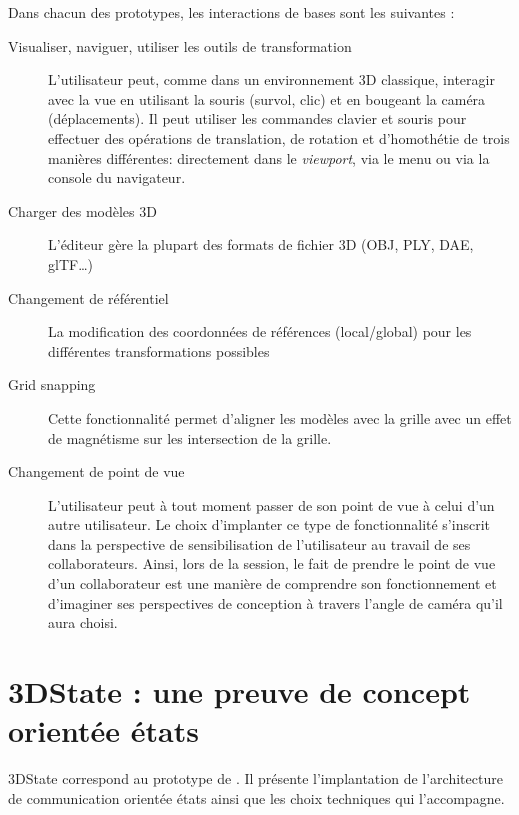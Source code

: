Dans chacun des prototypes, les interactions de bases sont les suivantes :
\begin{description}
	
	\item[Visualiser, naviguer, utiliser les outils de transformation] L'utilisateur peut, 
	com\-me dans un environnement \gls{3D} classique, interagir avec la vue en 
	utilisant 
	la souris (survol, clic) et en bougeant la caméra (déplacements). Il peut 
	utiliser les commandes clavier et souris pour effectuer des opérations de 
	translation, de rotation et d'homothétie de trois manières différentes: 
	directement dans le \textit{viewport}, via le 
	menu ou via la console du navigateur.
	\item[Charger des modèles \gls{3D}] L'éditeur gère la plupart des formats de 
	fichier 
	3D (OBJ, PLY, DAE, glTF\ldots)
	\item[Changement de référentiel] La modification des coordonnées de 
	réfé\-ren\-ces (local/global)  pour les différentes transformations possibles
	\item[Grid snapping] Cette fonctionnalité permet d'aligner les modèles avec la 
	grille avec un effet de magnétisme sur les intersection de la grille.
	\item[Changement de point de vue] L'utilisateur peut à tout moment passer de 
	son point de vue à celui d'un autre utilisateur. Le choix d'implanter ce type de 
	fonctionnalité s'inscrit dans la perspective de sensibilisation de l'utilisateur au 
	travail de ses collaborateurs. Ainsi, lors de la session, le fait de prendre le 
	point de vue d'un collaborateur est une manière de 
	comprendre son fonctionnement et d'imaginer ses 
	perspectives de conception à travers l'angle de caméra qu'il aura choisi.
\end{description}


\section{3DState : une preuve de concept orientée états}

3DState correspond au prototype de 
\cite{Desprat2015a,Desprat2015b}. Il présente l'implantation de l'architecture de 
communication orientée états ainsi que les choix techniques qui l'accompagne.



